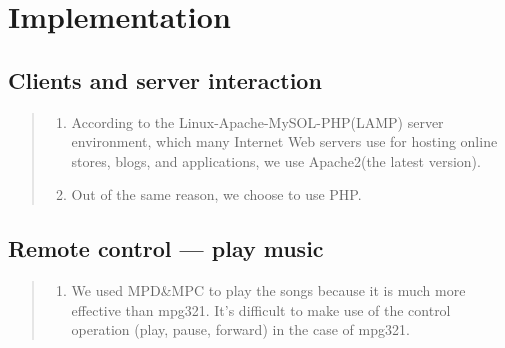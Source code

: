 \section*{Implementation}
\subsection*{Clients and server interaction}
\begin{quote}
\begin{enumerate}
\item
According to the Linux-Apache-MySOL-PHP(LAMP) server environment, which many Internet Web servers use for hosting online stores, blogs, and applications, we use Apache2(the latest version).
\item
Out of the same reason, we choose to use PHP.
\end{enumerate}
\end{quote}
\subsection*{Remote control --- play music}
\begin{quote}
\begin{enumerate}
\item
We used MPD\&MPC to play the songs because it is much more effective than mpg321. It’s difficult to make use of the control operation (play, pause, forward) in the case of mpg321.
\end{enumerate}
\end{quote}
